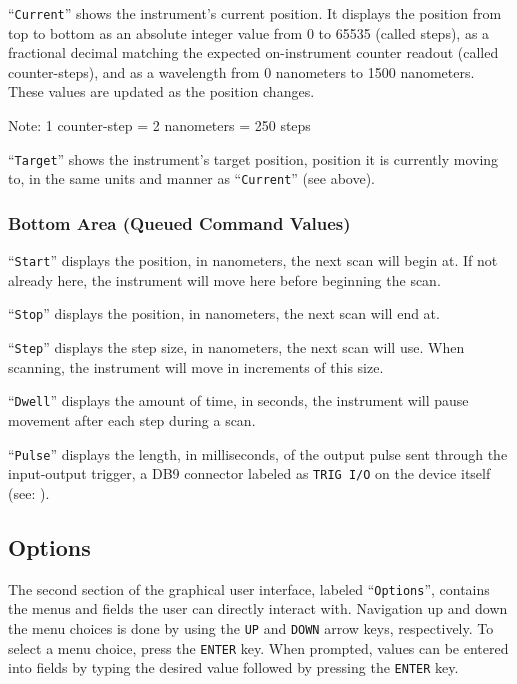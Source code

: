 \documentclass{article}
\begin{document}
``\verb|Current|'' shows the instrument's current position. It displays the position from top to bottom as an absolute integer value from 0 to 65535 (called steps), as a fractional decimal matching the expected on-instrument counter readout (called counter-steps), and as a wavelength from 0 nanometers to 1500 nanometers. These values are updated as the position changes.

Note: 1 counter-step = 2 nanometers = 250 steps

``\verb|Target|'' shows the instrument's target position, position it is currently moving to, in the same units and manner as ``\verb|Current|'' (see above).

\subsubsection{Bottom Area (Queued Command Values)} \label{subsubsection:statusbottomarea}

``\verb|Start|'' displays the position, in nanometers, the next scan will begin at. If not already here, the instrument will move here before beginning the scan.

``\verb|Stop|'' displays the position, in nanometers, the next scan will end at.

``\verb|Step|'' displays the step size, in nanometers, the next scan will use. When scanning, the instrument will move in increments of this size.

``\verb|Dwell|'' displays the amount of time, in seconds, the instrument will pause movement after each step during a scan.

``\verb|Pulse|'' displays the length, in milliseconds, of the output pulse sent through the input-output trigger, a DB9 connector labeled as \verb|TRIG I/O| on the device itself (see: ).

\subsection{Options} \label{subsection:options}

The second section of the graphical user interface, labeled ``\verb|Options|'', contains the menus and fields the user can directly interact with. Navigation up and down the menu choices is done by using the \verb|UP| and \verb|DOWN| arrow keys, respectively. To select a menu choice, press the \verb|ENTER| key. When prompted, values can be entered into fields by typing the desired value followed by pressing the \verb|ENTER| key.
\end{document}

